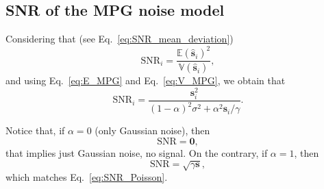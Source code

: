 \subsection{SNR of the MPG noise model}
Considering that (see Eq.~\ref{eq:SNR_mean_deviation})
\begin{equation}
  \text{SNR}_i = \frac{\mathbb{E}(\hat{\mathbf{s}}_i)^2}{\mathbb{V}(\hat{\mathbf{s}}_i)},
\end{equation}
and using Eq.~\ref{eq:E_MPG} and Eq.~\ref{eq:V_MPG}, we obtain that
\begin{equation}
  \text{SNR}_i = \frac{\mathbf{s}_i^2}{(1-\alpha)^2\sigma^2 + \alpha^2\mathbf{s}_i/\gamma}.
  \label{eq:SNR_MPG}
\end{equation}

Notice that, if $\alpha=0$ (only Gaussian noise), then
\begin{equation}
  \text{SNR} = \mathbf{0},
\end{equation}
that implies just Gaussian noise, no signal. On the contrary, if
$\alpha=1$, then
\begin{equation}
  \text{SNR} = \sqrt{\gamma\mathbf{s}},
\end{equation}
which matches Eq.~\ref{eq:SNR_Poisson}.

\begin{comment}
In particular, for $\mathbf{s}=\mathbf{0}$ (a constant signal
with zeros), Equations \ref{eq:E_MPG} and \ref{eq:V_MPG}
become
\begin{equation}
  \mathbb{E}(\mathbf{\hat{\mathbf{s}}}) = 0,
\end{equation}
and
\begin{equation}
  \mathbb{V}(\hat{\mathbf{s}}) = (1-\alpha)\sigma^2,
\end{equation}
and for $\mathbf{s}=\mathbf{1}$ (a constant signal with ones)
\begin{equation}
  \mathbb{E}(\hat{\mathbf{s}}) = \mathbb{E}(\mathbf{1}) = 1,
\end{equation}
and
\begin{equation}
  \mathbb{V}(\hat{\mathbf{s}}) = (1-\alpha)\sigma^2 + \alpha/\gamma.
\end{equation}
\end{comment}

    

